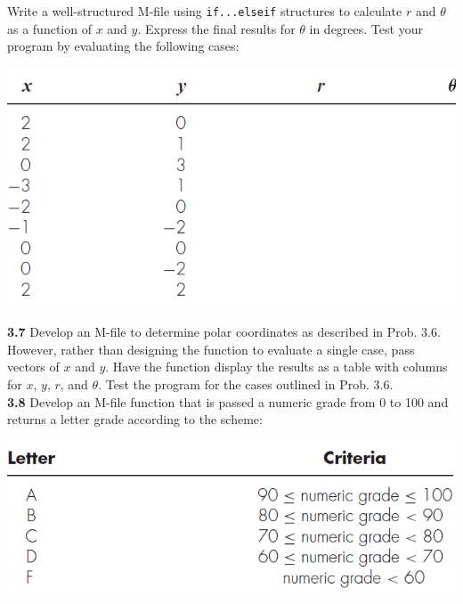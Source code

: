 \documentclass[../main.tex]{subfiles}
\begin{document}
\begin{multicols}{2}
    \noindent
    Write a well-structured M-file using \texttt{if...elseif} structures
    to calculate $r$ and $\theta$ as a function of $x$ and $y$. Express the
    final results for $\theta$ in degrees. Test your program by evaluating
    the following cases:\\

    \noindent
    \begin{minipage}{\linewidth}
        \centering
        \includegraphics[width=0.9\linewidth]{./images/problem_3_3_6}
    \end{minipage}

    \noindent\textbf{3.7} Develop an M-file to determine polar coordinates as
    described in Prob. 3.6. However, rather than designing the
    function to evaluate a single case, pass vectors of $x$ and $y$.
    Have the function display the results as a table with columns
    for $x$, $y$, $r$, and $\theta$. Test the program for the cases outlined in
    Prob. 3.6.\\

    \noindent\textbf{3.8} Develop an M-file function that is passed a numeric
    grade from 0 to 100 and returns a letter grade according to
    the scheme:\\

    \noindent
    \begin{minipage}{\linewidth}
        \centering
        \includegraphics[width=0.9\linewidth]{./images/problem_3_3_7}
    \end{minipage}


\end{multicols}
\end{document}
